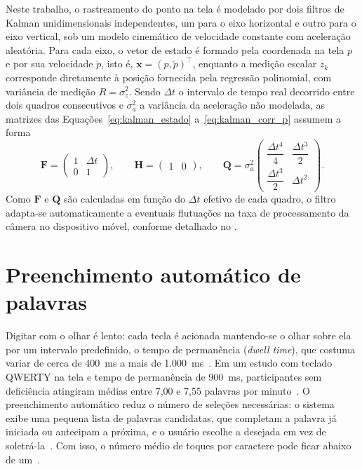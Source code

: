 Neste trabalho, o rastreamento do ponto na tela é modelado por dois filtros de Kalman unidimensionais independentes, um para o eixo horizontal e outro para o eixo vertical, sob um modelo cinemático de velocidade constante com aceleração aleatória. Para cada eixo, o vetor de estado é formado pela coordenada na tela $p$ e por sua velocidade $\dot{p}$, isto é, $\mathbf{x} = (p, \dot{p})^\top$, enquanto a medição escalar $z_k$ corresponde diretamente à posição fornecida pela regressão polinomial, com variância de medição $R = \sigma_z^2$. Sendo $\Delta t$ o intervalo de tempo real decorrido entre dois quadros consecutivos e $\sigma_a^2$ a variância da aceleração não modelada, as matrizes das Equações~\ref{eq:kalman_estado} a~\ref{eq:kalman_corr_p} assumem a forma
\begin{equation}
    \mathbf{F} = \begin{pmatrix} 1 & \Delta t \\ 0 & 1 \end{pmatrix}, \qquad
    \mathbf{H} = \begin{pmatrix} 1 & 0 \end{pmatrix}, \qquad
    \mathbf{Q} = \sigma_a^2 \begin{pmatrix} \dfrac{\Delta t^4}{4} & \dfrac{\Delta t^3}{2} \\[2ex] \dfrac{\Delta t^3}{2} & \Delta t^2 \end{pmatrix}.
    \label{eq:kalman_matrizes}
\end{equation}
Como $\mathbf{F}$ e $\mathbf{Q}$ são calculadas em função do $\Delta t$ efetivo de cada quadro, o filtro adapta-se automaticamente a eventuais flutuações na taxa de processamento da câmera no dispositivo móvel, conforme detalhado no .
\section{Preenchimento automático de palavras} \label{sec:preenchimento}

Digitar com o olhar é lento: cada tecla é acionada mantendo-se o olhar sobre ela por um intervalo predefinido, o tempo de permanência (\textit{dwell time}), que costuma variar de cerca de 400~ms a mais de 1.000~ms~\cite{mackenzie2008eye}. Em um estudo com teclado QWERTY na tela e tempo de permanência de 900~ms, participantes sem deficiência atingiram médias entre 7,00 e 7,55 palavras por minuto~\cite{majaranta2003auditory}. O preenchimento automático reduz o número de seleções necessárias: o sistema exibe uma pequena lista de palavras candidatas, que completam a palavra já iniciada ou antecipam a próxima, e o usuário escolhe a desejada em vez de soletrá-la~\cite{mackenzie2008eye}. Com isso, o número médio de toques por caractere pode ficar abaixo de um~\cite{mackenzie2002kspc}.

